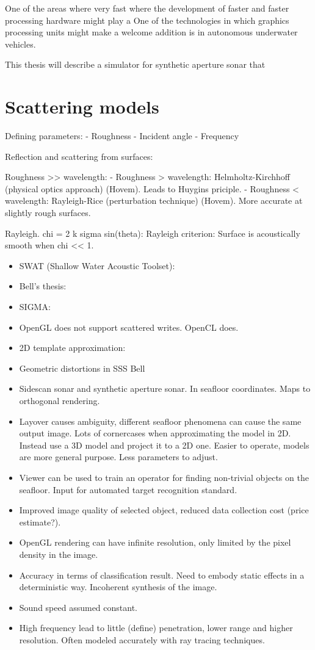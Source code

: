 One of the areas where very fast where the development of faster and faster processing hardware might play a
One of the technologies in which graphics processing units might make a welcome addition is in autonomous underwater vehicles. 

This thesis will describe a simulator for synthetic aperture sonar that 

\section{Scattering models}


Defining parameters:
- Roughness
- Incident angle
- Frequency


Reflection and scattering from surfaces:

Roughness >> wavelength:
- Roughness > wavelength: Helmholtz-Kirchhoff (physical optics approach) (Hovem). Leads to Huygins priciple.
- Roughness < wavelength: Rayleigh-Rice (perturbation technique) (Hovem). More accurate at slightly rough surfaces.

Rayleigh. chi = 2 k sigma sin(theta): Rayleigh criterion: Surface is acoustically smooth when chi << 1.

\begin{itemize}
\item SWAT (Shallow Water Acoustic Toolset): 
\item Bell's thesis:
\item SIGMA:
\item OpenGL does not support scattered writes. OpenCL does.
\item 2D template approximation:
\item Geometric distortions in SSS \cite{Cobra1992} Bell
\item Sidescan sonar and synthetic aperture sonar. In seafloor coordinates. Maps to orthogonal rendering.
\item Layover causes ambiguity, different seafloor phenomena can cause the same output image. Lots of cornercases when approximating the model in 2D. Instead use a 3D model and project it to a 2D one. Easier to operate, models are more general purpose. Less parameters to adjust.
\item Viewer can be used to train an operator for finding non-trivial objects on the seafloor. Input for automated target recognition standard.
\item Improved image quality of selected object, reduced data collection cost (price estimate?).
\item OpenGL rendering can have infinite resolution, only limited by the pixel density in the image.
\item Accuracy in terms of classification result. Need to embody static effects in a deterministic way. Incoherent synthesis of the image.
\item Sound speed assumed constant.
\item High frequency lead to little (define) penetration, lower range and higher resolution. Often modeled accurately with ray tracing techniques.
\end{itemize}

